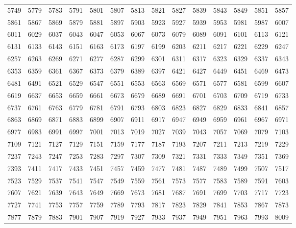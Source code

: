 \documentclass[10pt, a4paper]{article}
\begin{document}
\begin{center}
\begin{longtable}{c c c c c c c c c c c c c c}
        5749 & 5779 & 5783 & 5791 & 5801 & 5807 & 5813 & 5821 & 5827 & 5839 & 5843 & 5849 & 5851 & 5857 \\
        5861 & 5867 & 5869 & 5879 & 5881 & 5897 & 5903 & 5923 & 5927 & 5939 & 5953 & 5981 & 5987 & 6007 \\
        6011 & 6029 & 6037 & 6043 & 6047 & 6053 & 6067 & 6073 & 6079 & 6089 & 6091 & 6101 & 6113 & 6121 \\
        6131 & 6133 & 6143 & 6151 & 6163 & 6173 & 6197 & 6199 & 6203 & 6211 & 6217 & 6221 & 6229 & 6247 \\
        6257 & 6263 & 6269 & 6271 & 6277 & 6287 & 6299 & 6301 & 6311 & 6317 & 6323 & 6329 & 6337 & 6343 \\
        6353 & 6359 & 6361 & 6367 & 6373 & 6379 & 6389 & 6397 & 6421 & 6427 & 6449 & 6451 & 6469 & 6473 \\
        \hline
        6481 & 6491 & 6521 & 6529 & 6547 & 6551 & 6553 & 6563 & 6569 & 6571 & 6577 & 6581 & 6599 & 6607 \\
        6619 & 6637 & 6653 & 6659 & 6661 & 6673 & 6679 & 6689 & 6691 & 6701 & 6703 & 6709 & 6719 & 6733 \\
        6737 & 6761 & 6763 & 6779 & 6781 & 6791 & 6793 & 6803 & 6823 & 6827 & 6829 & 6833 & 6841 & 6857 \\
        6863 & 6869 & 6871 & 6883 & 6899 & 6907 & 6911 & 6917 & 6947 & 6949 & 6959 & 6961 & 6967 & 6971 \\
        6977 & 6983 & 6991 & 6997 & 7001 & 7013 & 7019 & 7027 & 7039 & 7043 & 7057 & 7069 & 7079 & 7103 \\
        7109 & 7121 & 7127 & 7129 & 7151 & 7159 & 7177 & 7187 & 7193 & 7207 & 7211 & 7213 & 7219 & 7229 \\
        7237 & 7243 & 7247 & 7253 & 7283 & 7297 & 7307 & 7309 & 7321 & 7331 & 7333 & 7349 & 7351 & 7369 \\
        7393 & 7411 & 7417 & 7433 & 7451 & 7457 & 7459 & 7477 & 7481 & 7487 & 7489 & 7499 & 7507 & 7517 \\
        7523 & 7529 & 7537 & 7541 & 7547 & 7549 & 7559 & 7561 & 7573 & 7577 & 7583 & 7589 & 7591 & 7603 \\
        7607 & 7621 & 7639 & 7643 & 7649 & 7669 & 7673 & 7681 & 7687 & 7691 & 7699 & 7703 & 7717 & 7723 \\
        \hline
        7727 & 7741 & 7753 & 7757 & 7759 & 7789 & 7793 & 7817 & 7823 & 7829 & 7841 & 7853 & 7867 & 7873 \\
        7877 & 7879 & 7883 & 7901 & 7907 & 7919 & 7927 & 7933 & 7937 & 7949 & 7951 & 7963 & 7993 & 8009 \\

\end{longtable}
\end{center}
\end{document}
